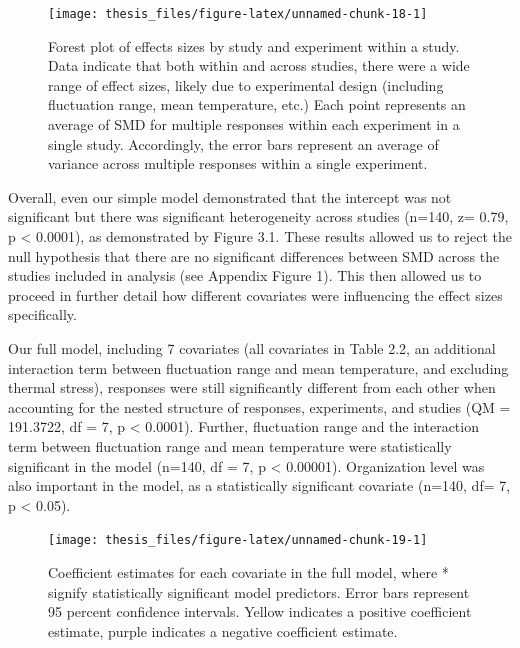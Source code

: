 \documentclass[12pt,twoside]{reedthesis}
\begin{document}
\begin{figure}

{\centering \texttt{[image: thesis\_files/figure-latex/unnamed-chunk-18-1]} 

}

\caption[Forest plot of effect sizes]{Forest plot of effects sizes by study and experiment within a study. Data indicate that both within and across studies, there were a wide range of effect sizes, likely due to experimental design (including fluctuation range, mean temperature, etc.) Each point represents an average of SMD for multiple responses within each experiment in a single study. Accordingly, the error bars represent an average of variance across multiple responses within a single experiment.}\label{fig:unnamed-chunk-18}
\end{figure}
Overall, even our simple model demonstrated that the intercept was not significant but there was significant heterogeneity across studies (n=140, z= 0.79, p \textless{} 0.0001), as demonstrated by Figure 3.1. These results allowed us to reject the null hypothesis that there are no significant differences between SMD across the studies included in analysis (see Appendix Figure 1). This then allowed us to proceed in further detail how different covariates were influencing the effect sizes specifically.

Our full model, including 7 covariates (all covariates in Table 2.2, an additional interaction term between fluctuation range and mean temperature, and excluding thermal stress), responses were still significantly different from each other when accounting for the nested structure of responses, experiments, and studies (QM = 191.3722, df = 7, p \textless{} 0.0001). Further, fluctuation range and the interaction term between fluctuation range and mean temperature were statistically significant in the model (n=140, df = 7, p \textless{} 0.00001). Organization level was also important in the model, as a statistically significant covariate (n=140, df= 7, p \textless{} 0.05).
\begin{figure}

{\centering \texttt{[image: thesis\_files/figure-latex/unnamed-chunk-19-1]} 

}

\caption[Coefficient estimates for full model]{Coefficient estimates for each covariate in the full model, where * signify statistically significant model predictors.  Error bars represent 95 percent confidence intervals. Yellow indicates a positive coefficient estimate, purple indicates a negative coefficient estimate.}\label{fig:unnamed-chunk-19}
\end{figure}
\clearpage
\end{document}
